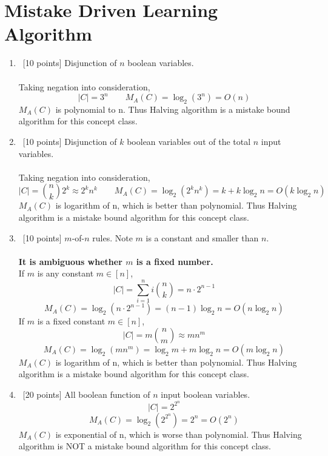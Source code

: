 \documentclass[12pt, fullpage,letterpaper]{article}
\begin{document}
\section{Mistake Driven Learning Algorithm}
\begin{enumerate}
\item~[10 points] Disjunction of $n$ boolean variables.\\\\
Taking negation into consideration, 
$$|C|=3^n \qquad M_A(C)=\log_2(3^n)=O(n)$$
$M_A(C)$ is polynomial to n. Thus Halving algorithm is a mistake bound algorithm for this concept class.
\item~[10 points] Disjunction of $k$ boolean variables out of the total $n$ input variables.\\\\
Taking negation into consideration, 
$$|C|={n\choose k}2^k\approx2^kn^k \qquad M_A(C)=\log_2(2^kn^k)=k+k\log_2n=O(k\log_2n)$$
$M_A(C)$ is logarithm of n, which is better than polynomial. Thus Halving algorithm is a mistake bound algorithm for this concept class.
\item~[10 points] $m$-of-$n$ rules. Note $m$ is a constant and smaller than $n$.\\\\
\textbf{It is ambiguous whether $m$ is a fixed number.}\\
If $m$ is any constant $m\in[n]$,
$$|C|=\sum_{i=1}^{n}i{n\choose k}=n\cdot2^{n-1}$$
$$M_A(C)=\log_2(n\cdot2^{n-1})=(n-1)\log_2n=O(n\log_2n)$$
If $m$ is a fixed constant $m\in[n]$,
$$|C|=m{n\choose m}\approx mn^m$$
$$M_A(C)=\log_2(mn^m)=\log_2m+m\log_2n=O(m\log_2n)$$
$M_A(C)$ is logarithm of n, which is better than polynomial. Thus Halving algorithm is a mistake bound algorithm for this concept class.
\item~[20 points] All boolean function of $n$ input boolean variables.
$$|C|=2^{2^n}$$
$$M_A(C)=\log_2(2^{2^n})=2^n=O(2^n)$$
$M_A(C)$ is exponential of n, which is worse than polynomial. Thus Halving algorithm is NOT a mistake bound algorithm for this concept class.
\end{enumerate}
\end{document}
